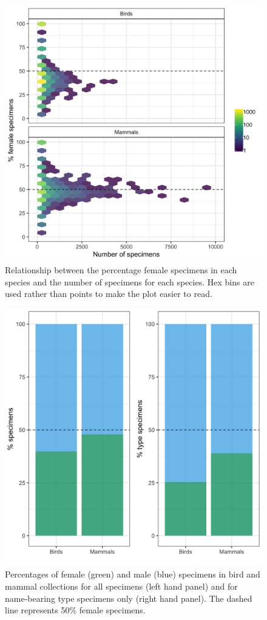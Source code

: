 \documentclass[a4paper, 12pt]{article}
\begin{document}
\begin{figure}
 \centering
  \includegraphics[width = \linewidth]{figures/specimens-numbers-all.png}
  \caption{Relationship between the percentage female specimens in each species and the number of specimens for each species. 
  Hex bins are used rather than points to make the plot easier to read.}
  \label{fig-hex}
\end{figure}

\begin{figure}[H]
 \centering
  \includegraphics[width = \linewidth]{figures/types-all.png}
  \caption{Percentages of female (green) and male (blue) specimens in bird and mammal collections for all specimens (left hand panel) and for name-bearing type specimens only (right hand panel). 
  The dashed line represents 50\% female specimens.}
  \label{fig-types}
\end{figure}
\end{document}
